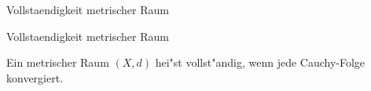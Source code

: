 \documentclass[class=article, crop=false]{standalone}
\begin{document}
\begin{zettel}{Vollstaendigkeit metrischer Raum}
\begin{flashcard}[pf0zgye1]{Vollstaendigkeit metrischer Raum}
	\begin{definition}
		Ein metrischer Raum $(X,d)$ hei"st vollst"andig, wenn jede Cauchy-Folge konvergiert.
	\end{definition}

\end{flashcard}
\end{zettel}
\end{document}
